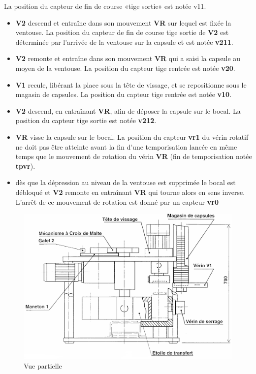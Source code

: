 La position du capteur de fin de course «tige sortie» est notée v11. 
\begin{itemize}
 \item \textbf{V2} descend et entraîne dans son mouvement \textbf{VR} sur lequel est fixée la ventouse. La position du capteur de fin de course \og tige sortie \fg de \textbf{V2} est déterminée par l'arrivée de la ventouse sur la capsule et est notée \textbf{v211}. 
 \item \textbf{V2} remonte et entraîne dans son mouvement \textbf{VR} qui a saisi la capsule au moyen de la ventouse. La position du capteur \og tige rentrée \fg est notée \textbf{v20}. 
 \item \textbf{V1} recule, libérant la place sous la tête de vissage, et se repositionne sous le magasin de capsules. La position du capteur \og tige rentrée \fg est notée \textbf{v10}.
 \item \textbf{V2} descend, en entraînant \textbf{VR}, afin de déposer la capsule sur le bocal. La position du capteur \og tige sortie \fg est notée \textbf{v212}. 
 \item \textbf{VR} visse la capsule sur le bocal. La position du capteur \textbf{vr1} du vérin rotatif ne doit pas être atteinte avant la fin d'une temporisation lancée en même temps que le mouvement de rotation du vérin \textbf{VR} (fin de temporisation notée \textbf{tpvr}). 
 \item dès que la dépression au niveau de la ventouse est supprimée le bocal est débloqué et \textbf{V2} remonte en entraînant \textbf{VR} qui tourne alors en sens inverse. L'arrêt de ce mouvement de rotation est donné par un capteur \textbf{vr0}
\end{itemize}

\begin{figure}
  \centering\includegraphics[width=0.8\linewidth]{img/Indexa1.png}
    \caption{Vue partielle}
  \label{img3}
\end{figure}

